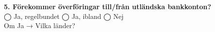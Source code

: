 \documentclass[10pt]{beamer}
\begin{document}
\begin{frame}[label=riskfragor-steg4]
  \vspace{0.3cm}

  \textbf{5. Förekommer överföringar till/från utländska bankkonton?}\\
  ◯ Ja, regelbundet \hspace{0.3cm} ◯ Ja, ibland \hspace{0.3cm} ◯ Nej\\
  Om Ja → Vilka länder? \underline{\hspace{5cm}}

  \vspace{0.5cm}
  \begin{flushright}
    \hyperlink{riskfragor-steg3}{} \hspace{0.3cm} \hyperlink{identitetskontroll}{}
  \end{flushright}
\end{frame}

% 
%

\end{document}
